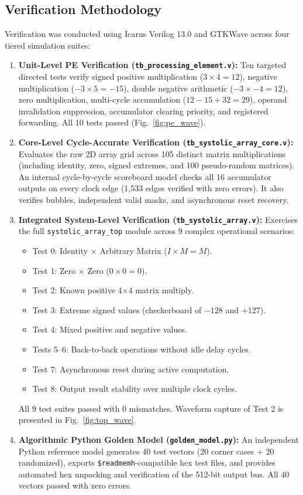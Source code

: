 \documentclass[conference]{IEEEtran}
\begin{document}
\subsection{Verification Methodology}
Verification was conducted using Icarus Verilog 13.0 and GTKWave across four tiered simulation suites:
\begin{enumerate}
    \item \textbf{Unit-Level PE Verification (\texttt{tb\_processing\_element.v}):} Ten targeted directed tests verify signed positive multiplication ($3 \times 4 = 12$), negative multiplication ($-3 \times 5 = -15$), double negative arithmetic ($-3 \times -4 = 12$), zero multiplication, multi-cycle accumulation ($12 - 15 + 32 = 29$), operand invalidation suppression, accumulator clearing priority, and registered forwarding. All 10 tests passed (Fig.~\ref{fig:pe_wave}).
    \item \textbf{Core-Level Cycle-Accurate Verification (\texttt{tb\_systolic\_array\_core.v}):} Evaluates the raw 2D array grid across 105 distinct matrix multiplications (including identity, zero, signed extremes, and 100 pseudo-random matrices). An internal cycle-by-cycle scoreboard model checks all 16 accumulator outputs on every clock edge (1,533 edges verified with zero errors). It also verifies bubbles, independent valid masks, and asynchronous reset recovery.
    \item \textbf{Integrated System-Level Verification (\texttt{tb\_systolic\_array.v}):} Exercises the full \texttt{systolic\_array\_top} module across 9 complex operational scenarios:
    \begin{itemize}
        \item Test 0: Identity $\times$ Arbitrary Matrix ($I \times M = M$).
        \item Test 1: Zero $\times$ Zero ($0 \times 0 = 0$).
        \item Test 2: Known positive 4$\times$4 matrix multiply.
        \item Test 3: Extreme signed values (checkerboard of $-128$ and $+127$).
        \item Test 4: Mixed positive and negative values.
        \item Tests 5--6: Back-to-back operations without idle delay cycles.
        \item Test 7: Asynchronous reset during active computation.
        \item Test 8: Output result stability over multiple clock cycles.
    \end{itemize}
    All 9 test suites passed with 0 mismatches. Waveform capture of Test 2 is presented in Fig.~\ref{fig:top_wave}.
    \item \textbf{Algorithmic Python Golden Model (\texttt{golden\_model.py}):} An independent Python reference model generates 40 test vectors (20 corner cases + 20 randomized), exports \texttt{\$readmemh}-compatible hex test files, and provides automated hex unpacking and verification of the 512-bit output bus. All 40 vectors passed with zero errors.
\end{enumerate}
\end{document}
